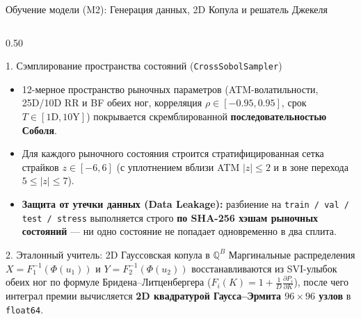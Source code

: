 \documentclass[aspectratio=169, 9pt]{beamer}
\begin{document}
\begin{frame}{Обучение модели (M2): Генерация данных, 2D Копула и решатель Джекеля}
  \begin{columns}[T]
    \begin{column}{0.50\textwidth}
      \begin{block}{1. Сэмплирование пространства состояний (\texttt{CrossSobolSampler})}
        \begin{itemize}
          \item 12-мерное пространство рыночных параметров (ATM-волатильности, 25D/10D RR и BF обеих ног, корреляция $\rho \in [-0.95, 0.95]$, срок $T \in [1\text{D}, 10\text{Y}]$) покрывается скремблированной \textbf{последовательностью Соболя}.
          \item Для каждого рыночного состояния строится стратифицированная сетка страйков $z \in [-6, 6]$ (с уплотнением вблизи ATM $|z| \le 2$ и в зоне перехода $5 \le |z| \le 7$).
          \item \textbf{Защита от утечки данных (Data Leakage):} разбиение на \texttt{train / val / test / stress} выполняется строго \textbf{по SHA-256 хэшам рыночных состояний} — ни одно состояние не попадает одновременно в два сплита.
        \end{itemize}
      \end{block}

      \begin{block}{2. Эталонный учитель: 2D Гауссовская копула в $\mathbb{Q}^B$}
        Маргинальные распределения $X = F_1^{-1}(\Phi(u_1))$ и $Y = F_2^{-1}(\Phi(u_2))$ восстанавливаются из SVI-улыбок обеих ног по формуле Бридена--Литценбергера ($F_i(K) = 1 + \frac{1}{D}\frac{\partial P_i}{\partial K}$), после чего интеграл премии вычисляется \textbf{2D квадратурой Гаусса--Эрмита $96 \times 96$ узлов} в \texttt{float64}.
      \end{block}
    \end{column}


\end{columns}
\end{frame}
\end{document}
